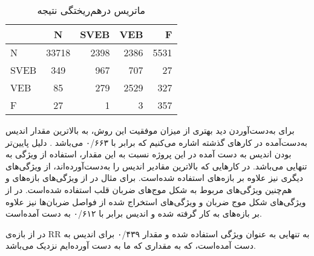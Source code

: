 \begin{table}
\begin{center}
\begin{latin}
  \begin{tabular}{  l | c | r | r | r |}
    
     & N & SVEB & VEB & F \\ \hline
    N & 33718 & 2398 & 2386  & 5531\\ \hline
    SVEB & 349 & 967 & 707 & 27 \\ \hline
    VEB & 85 & 279 & 2529 & 327 \\ \hline
    F & 27 & 1 & 3 & 357 \\  \hline
  \end{tabular}
  
\end{latin}
\caption{ماتریس درهم‌ریختگی نتیجه}
\end{center}
\label{table:confmat}
\end{table}

برای به‌دست‌آوردن دید بهتری از میزان موفقیت این روش، به بالاترین مقدار اندیس  به‌دست‌آمده در کارهای گذشته اشاره می‌کنیم که برابر با ۰/۶۶۳ می‌باشد \cite{Mar2011}. دلیل پایین‌تر بودن اندیس  به ‌دست‌ آمده در این پروژه نسبت به این مقدار، استفاده از ویژگی  به تنهایی می‌باشد. در کارهایی که بالاترین مقادیر اندیس  را به‌دست‌آورده‌اند، از ویژگی‌های دیگری نیز علاوه بر بازه‌های  استفاده شده‌است. برای مثال در  \cite{Zhang2014} از ویژگی‌های بازه‌های  و هم‌چنین ویژگی‌های مربوط به شکل موج‌های ضربان قلب استفاده شده‌است. در \cite{deChazal2004} از ویژگی‌های شکل موج ضربان و ویژگی‌های استخراج شده از فواصل ضربان‌ها نیز علاوه بر بازه‌های  به کار گرفته شده و اندیس  برابر با ۰/۶۱۲ به دست آمده‌است.
 
در \cite{Mondejar} از بازه‌ی RR به تنهایی به عنوان ویژگی استفاده شده و مقدار ۰/۴۳۹ برای اندیس  به‌ دست‌ آمده‌است، که به مقداری که ما به دست آورده‌ایم نزدیک می‌باشد. 




